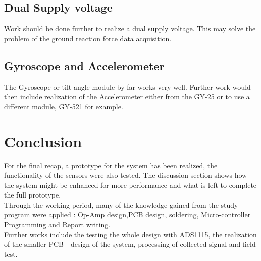 \documentclass[12pt,a4paper]{article}
\begin{document}
\subsection{Dual Supply voltage}
Work should be done further to realize a dual supply voltage. This may solve the problem of the ground reaction force data acquisition.
\subsection{Gyroscope and Accelerometer}
The Gyroscope or tilt angle module by far works very well. Further work would then include realization of the Accelerometer either from the GY-25 or to use a different module, GY-521 for example.
\section{Conclusion}
For the final recap, a prototype for the system has been realized, the functionality of the sensors were also tested. The discussion section shows how the system might be enhanced for more performance and what is left to complete the full prototype.\\
Through the working period, many of the knowledge gained from the study program were applied : Op-Amp design,PCB design, soldering, Micro-controller Programming and Report writing.\\
Further works include the testing the whole design with ADS1115, the realization of the smaller PCB - design of the system, processing of collected signal and field test.
\end{document}
